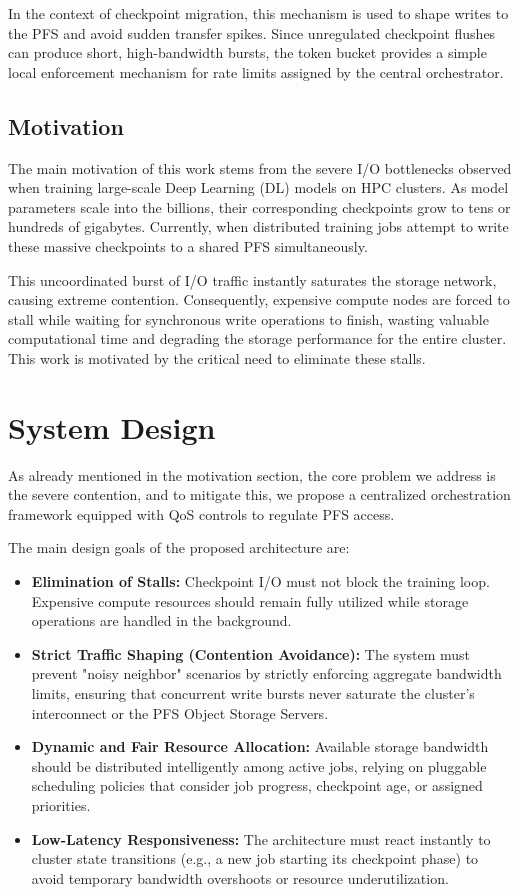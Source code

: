 \documentclass[sigplan,twocolumn,10pt,nonacm]{acmart}
\begin{document}
In the context of checkpoint migration, this mechanism is used to shape writes
to the PFS and avoid sudden transfer spikes. Since unregulated checkpoint
flushes can produce short, high-bandwidth bursts, the token bucket provides a
simple local enforcement mechanism for rate limits assigned by the central
orchestrator.

\subsection{Motivation}

The main motivation of this work stems from the severe I/O bottlenecks observed when training large-scale Deep Learning (DL) models on HPC clusters.
As model parameters scale into the billions, their corresponding checkpoints grow to tens or hundreds of gigabytes. Currently, when distributed training
jobs attempt to write these massive checkpoints to a shared PFS simultaneously.

This uncoordinated burst of I/O traffic instantly saturates the storage network, causing extreme contention. Consequently, expensive compute nodes are
forced to stall while waiting for synchronous write operations to finish, wasting valuable computational time and degrading the storage performance for the
entire cluster. This work is motivated by the critical need to eliminate these stalls.

\section{System Design}

As already mentioned in the motivation section, the core problem we address is the severe contention, and to mitigate this, we propose a centralized orchestration
framework equipped with QoS controls to regulate PFS access.

The main design goals of the proposed architecture are:
\begin{itemize}
    \item \textbf{Elimination of Stalls:} Checkpoint I/O must not block the training loop. Expensive compute resources should remain fully utilized while
      storage operations are handled in the background.
    \item \textbf{Strict Traffic Shaping (Contention Avoidance):} The system must prevent "noisy neighbor" scenarios by strictly enforcing aggregate bandwidth
      limits, ensuring that concurrent write bursts never saturate the cluster's interconnect or the PFS Object Storage Servers.
    \item \textbf{Dynamic and Fair Resource Allocation:} Available storage bandwidth should be distributed intelligently among active jobs, relying on pluggable
      scheduling policies that consider job progress, checkpoint age, or assigned priorities.
    \item \textbf{Low-Latency Responsiveness:} The architecture must react instantly to cluster state transitions (e.g., a new job starting its checkpoint phase)
      to avoid temporary bandwidth overshoots or resource underutilization.
\end{itemize}
\end{document}
